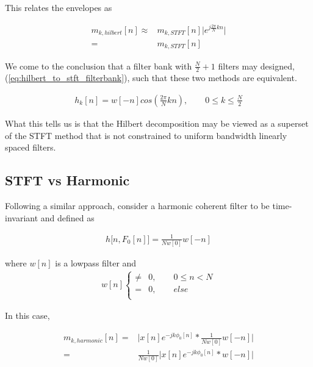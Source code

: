 \documentclass [11pt, proquest,oneside] {ganter_thesis}[2015/03/03]
\begin{document}
This relates the envelopes as 

\begin{align}
m_{k,hilbert}[n] \approx& m_{k,STFT}[n] \Big| e^{j\frac{2\pi}{N}kn} \Big| \nonumber \\
=& m_{k,STFT}[n]
\end{align}

We come to the conclusion that a filter bank with $\frac{N}{2} + 1$ filters may designed, (\ref{eq:hilbert_to_stft_filterbank}), such that these two methods are equivalent.

\begin{align}
\label{eq:hilbert_to_stft_filterbank}
h_k[n] = w[-n]cos(\frac{2\pi}{N}kn), \qquad 0 \leq k \leq \frac{N}{2}
\end{align}

What this tells us is that the Hilbert decomposition may be viewed as a superset of the STFT method that is not constrained to uniform bandwidth linearly spaced filters.

\subsection{STFT vs Harmonic}\label{ss:stft_vs_harmonic}

Following a similar approach, consider a harmonic coherent filter to be time-invariant and defined as

\begin{align}
h\big[n, F_0[n] \big] = \frac{1}{Nw[0]} w[-n]
\end{align}

where $w[n]$ is a lowpass filter and 
\begin{align}
w[n] \left\{
                \begin{array}{ll}
                \neq& 0, \qquad 0 \leq n < N \nonumber \\
			   =& 0, \qquad else \\
                \end{array}
              \right.
\end{align}

In this case,

\begin{align}
m_{k,harmonic}[n] =& \Big| x[n] e^{-jk\phi_0 [n]} *  \frac{1}{Nw[0]} w[-n] \Big|  \nonumber \\
\label{eq:m_k_harmonic_with_stft_filter}
=& \frac{1}{Nw[0]} \Big| x[n] e^{-jk\phi_0 [n]} *  w[-n] \Big|
\end{align}
\end{document}
